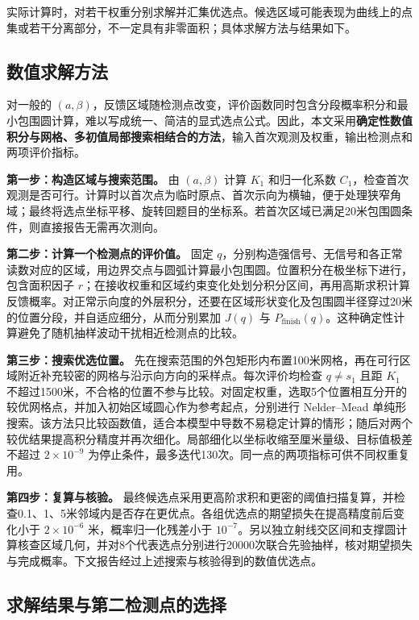 \documentclass[UTF8,a4paper,zihao=-4,fontset=none]{ctexart}
\begin{document}
实际计算时，对若干权重分别求解并汇集优选点。候选区域可能表现为曲线上的点集或若干分离部分，不一定具有非零面积；具体求解方法与结果如下。

\subsection{数值求解方法}

对一般的 \((a,\beta)\)，反馈区域随检测点改变，评价函数同时包含分段概率积分和最小包围圆计算，难以写成统一、简洁的显式选点公式。因此，本文采用\textbf{确定性数值积分与网格、多初值局部搜索相结合的方法}，输入首次观测及权重，输出检测点和两项评价指标。

\textbf{第一步：构造区域与搜索范围。} 由 \((a,\beta)\) 计算 \(K_1\) 和归一化系数 \(C_1\)，检查首次观测是否可行。计算时以首次点为临时原点、首次示向为横轴，便于处理狭窄角域；最终将选点坐标平移、旋转回题目的坐标系。若首次区域已满足20米包围圆条件，则直接报告无需再次测向。

\textbf{第二步：计算一个检测点的评价值。} 固定 \(q\)，分别构造强信号、无信号和各正常读数对应的区域，用边界交点与圆弧计算最小包围圆。位置积分在极坐标下进行，包含面积因子 \(r\)；在接收权重和区域约束变化处划分积分区间，再用高斯求积计算反馈概率。对正常示向度的外层积分，还要在区域形状变化及包围圆半径穿过20米的位置分段，并自适应细分，从而分别累加 \(J(q)\) 与 \(P_{\mathrm{finish}}(q)\)。这种确定性计算避免了随机抽样波动干扰相近检测点的比较。

\textbf{第三步：搜索优选位置。} 先在搜索范围的外包矩形内布置100米网格，再在可行区域附近补充较密的网格与沿示向方向的采样点。每次评价均检查 \(q\ne s_1\) 且距 \(K_1\) 不超过1500米，不合格的位置不参与比较。对固定权重，选取5个位置相互分开的较优网格点，并加入初始区域圆心作为参考起点，分别进行 Nelder--Mead 单纯形搜索。该方法只比较函数值，适合本模型中导数不易稳定计算的情形；随后对两个较优结果提高积分精度并再次细化。局部细化以坐标收缩至厘米量级、目标值极差不超过 \(2\times10^{-9}\) 为停止条件，最多迭代130次。同一点的两项指标可供不同权重复用。

\textbf{第四步：复算与核验。} 最终候选点采用更高阶求积和更密的阈值扫描复算，并检查0.1、1、5米邻域内是否存在更优点。各组优选点的期望损失在提高精度前后变化小于 \(2\times10^{-6}\) 米，概率归一化残差小于 \(10^{-7}\)。另以独立射线交区间和支撑圆计算核查区域几何，并对8个代表选点分别进行20000次联合先验抽样，核对期望损失与完成概率。下文报告经过上述搜索与核验得到的数值优选点。

\subsection{求解结果与第二检测点的选择}
\end{document}
